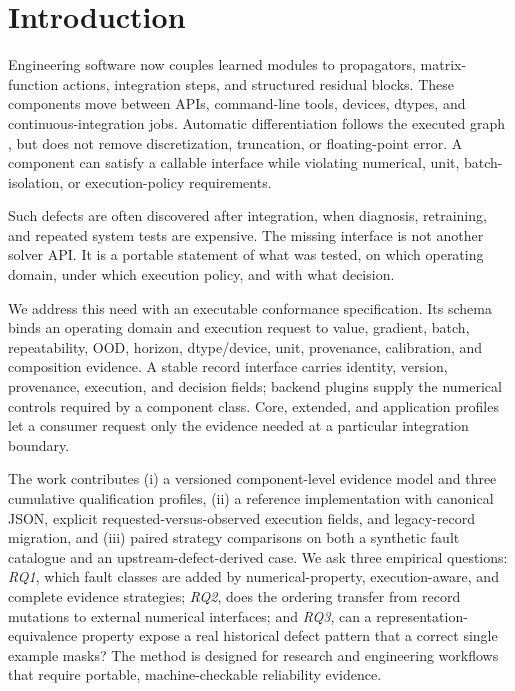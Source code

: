 \documentclass[preprint,12pt,authoryear]{elsarticle}
\begin{document}
\section{Introduction}
Engineering software now couples learned modules to propagators, matrix-function actions, integration steps, and structured residual blocks. These components move between APIs, command-line tools, devices, dtypes, and continuous-integration jobs. Automatic differentiation follows the executed graph \citep{baydin2018autodiff}, but does not remove discretization, truncation, or floating-point error. A component can satisfy a callable interface while violating numerical, unit, batch-isolation, or execution-policy requirements.

Such defects are often discovered after integration, when diagnosis, retraining, and repeated system tests are expensive. The missing interface is not another solver API. It is a portable statement of what was tested, on which operating domain, under which execution policy, and with what decision.

We address this need with an executable conformance specification. Its schema binds an operating domain and execution request to value, gradient, batch, repeatability, OOD, horizon, dtype/device, unit, provenance, calibration, and composition evidence. A stable record interface carries identity, version, provenance, execution, and decision fields; backend plugins supply the numerical controls required by a component class. Core, extended, and application profiles let a consumer request only the evidence needed at a particular integration boundary.

The work contributes (i) a versioned component-level evidence model and three cumulative qualification profiles, (ii) a reference implementation with canonical JSON, explicit requested-versus-observed execution fields, and legacy-record migration, and (iii) paired strategy comparisons on both a synthetic fault catalogue and an upstream-defect-derived case. We ask three empirical questions: \emph{RQ1}, which fault classes are added by numerical-property, execution-aware, and complete evidence strategies; \emph{RQ2}, does the ordering transfer from record mutations to external numerical interfaces; and \emph{RQ3}, can a representation-equivalence property expose a real historical defect pattern that a correct single example masks? The method is designed for research and engineering workflows that require portable, machine-checkable reliability evidence.
\end{document}
